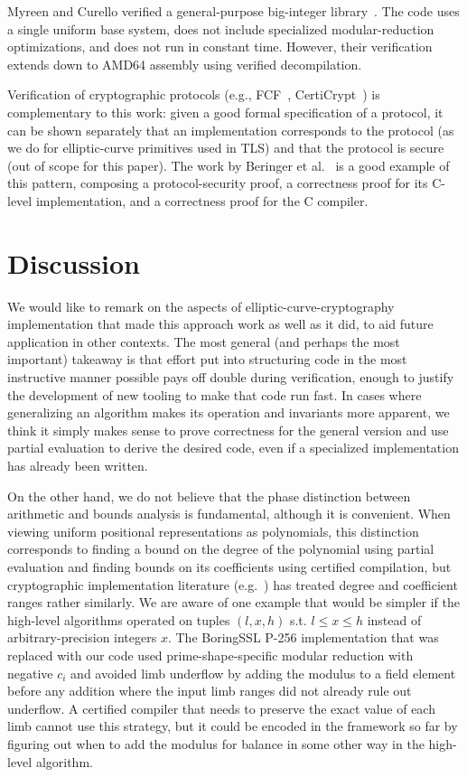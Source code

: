 \documentclass[conference,letterpaper]{IEEEtran}
\begin{document}
Myreen and Curello verified a general-purpose big-integer library~\cite{verifiedBignum}.
The code uses a single uniform base system, does not include specialized modular-reduction optimizations, and does not run in constant time.
However, their verification extends down to AMD64 assembly using verified decompilation.

Verification of cryptographic protocols (e.g., FCF~\cite{FCF}, CertiCrypt~\cite{CertiCrypt}) is complementary to this work: given a good formal specification of a protocol, it can be shown separately that an implementation corresponds to the protocol (as we do for elliptic-curve primitives used in TLS) and that the protocol is secure (out of scope for this paper).
The work by Beringer et al.~\cite{HMAC} is a good example of this pattern, composing a protocol-security proof, a correctness proof for its C-level implementation, and a correctness proof for the C compiler.

\section{Discussion}\label{conclusion}

We would like to remark on the aspects of elliptic-curve-cryptography implementation that made this approach work as well as it did, to aid future application in other contexts.
The most general (and perhaps the most important) takeaway is that effort put into structuring code in the most instructive manner possible pays off double during verification, enough to justify the development of new tooling to make that code run fast.
In cases where generalizing an algorithm makes its operation and invariants more apparent, we think it simply makes sense to prove correctness for the general version and use partial evaluation to derive the desired code, even if a specialized implementation has already been written.

On the other hand, we do not believe that the phase distinction between arithmetic and bounds analysis is fundamental, although it is convenient.
When viewing uniform positional representations as polynomials, this distinction corresponds to finding a bound on the degree of the polynomial using partial evaluation and finding bounds on its coefficients using certified compilation, but cryptographic implementation literature (e.g.~\cite{curve25519}) has treated degree and coefficient ranges rather similarly.
We are aware of one example that would be simpler if the high-level algorithms operated on tuples $(l, x, h)$ s.t. $l \le x \le h$ instead of arbitrary-precision integers $x$.
The BoringSSL P-256 implementation that was replaced with our code used prime-shape-specific modular reduction with negative $c_i$ and avoided limb underflow by adding the modulus to a field element before any addition where the input limb ranges did not already rule out underflow.
A certified compiler that needs to preserve the exact value of each limb cannot use this strategy, but it could be encoded in the framework so far by figuring out when to add the modulus for balance in some other way in the high-level algorithm.
\end{document}
